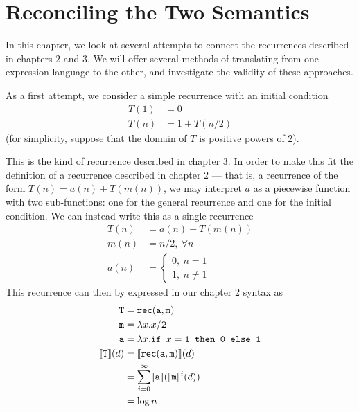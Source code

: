 \chapter{Reconciling the Two Semantics}
In this chapter, we look at several attempts to connect the recurrences described in chapters 2 and 3. We will offer
several methods of translating from one expression language to the other, and investigate the validity of these approaches.

As a first attempt, we consider a simple recurrence with an initial condition
\begin{align*}
T(1) &= 0 \\
T(n) &= 1 + T(n/2 ) 
\end{align*}
(for simplicity, suppose that the domain of $T$ is positive powers of $2$).

This is the kind of recurrence described in chapter 3. In order to make this fit the definition of a recurrence described in 
chapter 2 --- that is, a recurrence of the form $T(n) = a(n) + T(m(n))$, we may interpret $a$ as a 
piecewise function with two sub-functions: one for the general recurrence and one for the initial condition.
We can instead write this as a single recurrence
\begin{align*}
T(n) &= a(n) + T(m(n)) \\
m(n) &= n/2, \ \forall n \\ 
a(n) &=
\begin{cases} 
0, \ n = 1 \\
1, \ n \neq 1
\end{cases}
\end{align*} 
This recurrence can then by expressed in our chapter 2 syntax as 
\begin{align*}
\texttt{T} &= \texttt{rec}(\texttt{a},\texttt{m}) \\
\texttt{m} &= \lambda x.x/\texttt{2} \\
\texttt{a} &= \lambda x.\texttt{if } x=\texttt{1} \texttt{ then } \texttt{0} \texttt{ else } \texttt{1} \\
\llbracket \texttt{T} \rrbracket(d) &= \llbracket \texttt{rec}(\texttt{a},\texttt{m}) \rrbracket(d) \\
&= \sum_{i=0}^{\infty}\llbracket \texttt{a} \rrbracket(\llbracket \texttt{m}\rrbracket^i(d)) \\
&= \log n
\end{align*}

